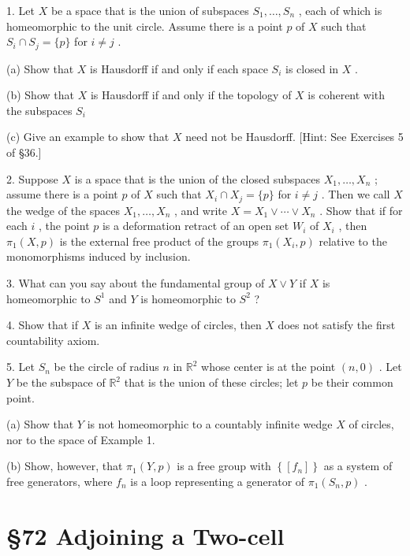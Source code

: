 \documentclass[10pt]{article}
\begin{document}
1. Let \(X\) be a space that is the union of subspaces \({S}_{1},\ldots ,{S}_{n}\) , each of which is homeomorphic to the unit circle. Assume there is a point \(p\) of \(X\) such that \({S}_{i} \cap  {S}_{j} = \{ p\}\) for \(i \neq  j\) .

(a) Show that \(X\) is Hausdorff if and only if each space \({S}_{i}\) is closed in \(X\) .

(b) Show that \(X\) is Hausdorff if and only if the topology of \(X\) is coherent with the subspaces \({S}_{i}\)

(c) Give an example to show that \(X\) need not be Hausdorff. [Hint: See Exercises 5 of §36.]

2. Suppose \(X\) is a space that is the union of the closed subspaces \({X}_{1},\ldots ,{X}_{n}\) ; assume there is a point \(p\) of \(X\) such that \({X}_{i} \cap  {X}_{j} = \{ p\}\) for \(i \neq  j\) . Then we call \(X\) the wedge of the spaces \({X}_{1},\ldots ,{X}_{n}\) , and write \(X = {X}_{1} \vee  \cdots  \vee  {X}_{n}\) . Show that if for each \(i\) , the point \(p\) is a deformation retract of an open set \({W}_{i}\) of \({X}_{i}\) , then \({\pi }_{1}\left( {X,p}\right)\) is the external free product of the groups \({\pi }_{1}\left( {{X}_{i},p}\right)\) relative to the monomorphisms induced by inclusion.

3. What can you say about the fundamental group of \(X \vee  Y\) if \(X\) is homeomorphic to \({S}^{1}\) and \(Y\) is homeomorphic to \({S}^{2}\) ?

4. Show that if \(X\) is an infinite wedge of circles, then \(X\) does not satisfy the first countability axiom.

5. Let \({S}_{n}\) be the circle of radius \(n\) in \({\mathbb{R}}^{2}\) whose center is at the point \(\left( {n,0}\right)\) . Let \(Y\) be the subspace of \({\mathbb{R}}^{2}\) that is the union of these circles; let \(p\) be their common point.

(a) Show that \(Y\) is not homeomorphic to a countably infinite wedge \(X\) of circles, nor to the space of Example 1.

(b) Show, however, that \({\pi }_{1}\left( {Y,p}\right)\) is a free group with \(\left\{  \left\lbrack  {f}_{n}\right\rbrack  \right\}\) as a system of free generators, where \({f}_{n}\) is a loop representing a generator of \({\pi }_{1}\left( {{S}_{n},p}\right)\) .

\section*{§72 Adjoining a Two-cell}
\end{document}

